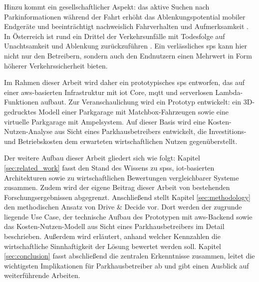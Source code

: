 Hinzu kommt ein gesellschaftlicher Aspekt: das aktive Suchen nach Parkinformationen während der Fahrt erhöht das Ablenkungspotential mobiler Endgeräte und beeinträchtigt nachweislich Fahrverhalten und Aufmerksamkeit \citep{oviedo-trespalaciosUnderstandingImpactsMobile2016}.
In Österreich ist rund ein Drittel der Verkehrsunfälle mit Todesfolge auf Unachtsamkeit und Ablenkung zurückzuführen \citep{bmi397VerkehrstoteAuf2026}.
Ein verlässliches \ac{sps} kann hier nicht nur den Betreibern, sondern auch den Endnutzern einen Mehrwert in Form höherer Verkehrssicherheit bieten.

Im Rahmen dieser Arbeit wird daher ein prototypisches \ac{sps} entworfen, das auf einer \ac{aws}-basierten Infrastruktur mit \ac{iot} Core, \ac{mqtt} und serverlosen Lambda-Funktionen aufbaut. Zur Veranschaulichung wird ein Prototyp entwickelt: ein 3D-gedrucktes Modell einer Parkgarage mit Matchbox-Fahrzeugen sowie eine virtuelle Parkgarage mit Ampelsystem. Auf dieser Basis wird eine Kosten-Nutzen-Analyse aus Sicht eines Parkhausbetreibers entwickelt, die Investitions- und Betriebskosten dem erwarteten wirtschaftlichen Nutzen gegenüberstellt.

Der weitere Aufbau dieser Arbeit gliedert sich wie folgt: Kapitel \ref{sec:related_work} fasst den Stand des Wissens zu \acp{sps}, \ac{iot}-basierten Architekturen sowie zu wirtschaftlichen Bewertungen vergleichbarer Systeme zusammen.
Zudem wird der eigene Beitrag dieser Arbeit von bestehenden Forschungsergebnissen abgegrenzt.
Anschließend stellt Kapitel \ref{sec:methodology} den methodischen Ansatz von Drive \& Decide vor.
Dort werden der zugrunde liegende Use Case, der technische Aufbau des Prototypen mit \ac{aws}-Backend sowie das Kosten-Nutzen-Modell aus Sicht eines Parkhausbetreibers im Detail beschrieben. Außerdem wird erläutert, anhand welcher Kennzahlen die wirtschaftliche Sinnhaftigkeit der Lösung bewertet werden soll.
Kapitel \ref{sec:conclusion} fasst abschließend die zentralen Erkenntnisse zusammen, leitet die wichtigsten Implikationen für Parkhausbetreiber ab und gibt einen Ausblick auf weiterführende Arbeiten.
